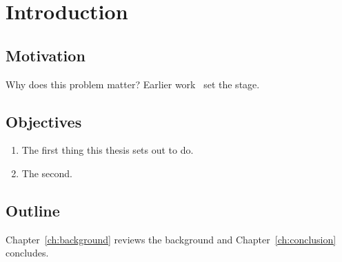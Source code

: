 \chapter{Introduction}
\label{ch:intro}

\section{Motivation}
Why does this problem matter? Earlier work~\cite{knuth1984texbook} set the stage.

\section{Objectives}
\begin{enumerate}
  \item The first thing this thesis sets out to do.
  \item The second.
\end{enumerate}

\section{Outline}
Chapter~\ref{ch:background} reviews the background and Chapter~\ref{ch:conclusion} concludes.
